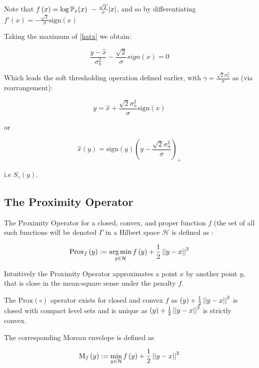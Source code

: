 Note that \( f\left(x\right) = \log{\pr_x{ \left( x \right)}} ~ -\frac{\sqrt{2}}{\sigma} |x| \), and so by differentiating \( f'\left(x\right) = -\frac{\sqrt{2}}{\sigma} \mathrm{sign}\left(x\right) \)

Taking the maximum of \ref{hatx} we obtain:

\begin{equation}
\frac{y-\hat{x}}{\sigma^2_n}-\frac{\sqrt{2}}{\sigma}sign(x) = 0
\end{equation}

Which leads the soft thresholding operation defined earlier, with \(\gamma = \frac{\sqrt{2}\sigma^2_n}{\sigma}\) as (via rearrangement):

$$
y =  \hat{x} + \frac{\sqrt{2}\sigma^2_n}{\sigma}\mathrm{sign}\left(x\right)
$$

or

$$
\hat{x}\left(y\right) = \mathrm{sign}(y)\left(y - \frac{\sqrt{2}\sigma^2_n}{\sigma}\right)_+
$$

i.e \(S_\gamma(y)\).

\subsection{The Proximity Operator}
The Proximity Operator for a closed, convex, and proper function \(f\) (the set of all such functions will be denoted \(\Gamma\) in a Hilbert space \(\mathcal{H}\) is defined as \cite{moreau1965proximite}:

\begin{definition}
\begin{equation}
\mathrm{Prox}_f\left(y\right) :=  \operatorname*{arg\,min}_{y \in \mathcal{H} } f\left(y\right) + \frac{1}{2}\left|\left|y-x\right|\right|^2
\end{equation}
\end{definition}

Intuitively the Proximity Operator approximates a point \(x\) by another point \(y\), that is close in the mean-square sense under the penalty \(f\).

The \(\mathrm{Prox}\left(\circ\right)\) operator exists for closed and convex \(f\) as \(\left(y\right) + \frac{1}{2}\left|\left|y-x\right|\right|^2\) is closed with compact level sets and is unique as \(\left(y\right) + \frac{1}{2}\left|\left|y-x\right|\right|^2\) is strictly convex.

The corresponding Moreau envelope is defined as 

\begin{definition}
\begin{equation}
\mathrm{M}_f\left(y\right) :=  \min_{y \in \mathcal{H}} f\left(y\right) + \frac{1}{2}\left|\left|y-x\right|\right|^2
\end{equation}
\end{definition}

